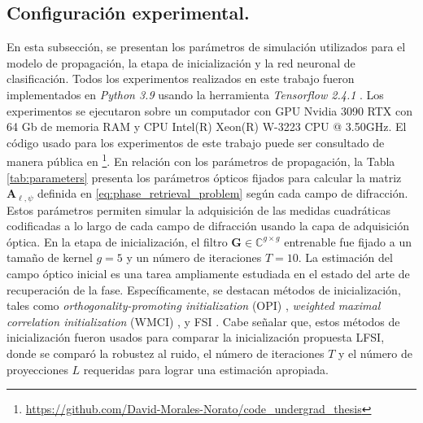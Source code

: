 
\subsection{Configuración experimental.}

En esta subsección, se presentan los parámetros de simulación utilizados para el modelo de propagación, la etapa de inicialización y la red neuronal de clasificación. Todos los experimentos realizados en este trabajo fueron implementados en \textit{Python 3.9} usando la herramienta \textit{Tensorflow 2.4.1}  . Los experimentos se ejecutaron sobre un computador con GPU Nvidia 3090 RTX con 64 Gb de memoria RAM y CPU Intel(R) Xeon(R) W-3223 CPU @ 3.50GHz. El código usado para los experimentos de este trabajo puede ser consultado de manera pública en \footnote{\href{https://github.com/David-Morales-Norato/code_undergrad_thesis}{https://github.com/David-Morales-Norato/code\_undergrad\_thesis}}. En relación con los parámetros de propagación,  la Tabla \ref{tab:parameters} presenta los parámetros ópticos fijados para calcular la matriz $\mathbf{A}_{\ell,\psi}$ definida en \eqref{eq:phase_retrieval_problem} según cada campo de difracción. Estos parámetros permiten simular la adquisición de las medidas cuadráticas codificadas a lo largo de cada campo de difracción usando la capa de adquisición óptica. En la etapa de inicialización, el filtro $\mathbf{G} \in \mathbb{C}^{g\times g}$ entrenable fue fijado a un tamaño de kernel $g=5$ y un número de iteraciones $T=10$. La estimación del campo óptico inicial es una tarea ampliamente estudiada en el estado del arte de recuperación de la fase. Específicamente, se destacan métodos de inicialización, tales como \textit{orthogonality-promoting initialization} (OPI) , \textit{weighted maximal correlation initialization} (WMCI) , y FSI . Cabe señalar que, estos métodos de inicialización fueron usados para comparar la inicialización propuesta LFSI, donde se comparó la robustez al ruido, el número de iteraciones ${T}$ y el número de proyecciones ${L}$ requeridas para lograr una estimación apropiada. 

